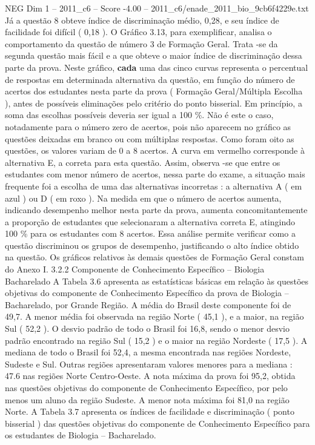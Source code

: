 \begin{textsample}{NEG Dim 1 – 2011\_c6 – Score -4.00 – 2011\_c6/enade\_2011\_bio\_9cb6f4229e.txt}
Já a questão 8 obteve índice de discriminação médio, 0,28, e seu índice de facilidade foi difícil ( 0,18 ).
O Gráfico 3.13, para exemplificar, analisa o comportamento da questão de número 3 de Formação Geral.
Trata -se da segunda questão mais fácil e a que obteve o maior índice de discriminação dessa parte da prova.
Neste gráfico, \textbf{cada} uma das cinco curvas representa o percentual de respostas em determinada alternativa da questão, em função do número de acertos dos estudantes nesta parte da prova ( Formação Geral/Múltipla Escolha ), antes de possíveis eliminações pelo critério do ponto bisserial.
Em princípio, a soma das escolhas possíveis deveria ser igual a 100 \%.
Não é este o caso, notadamente para o número zero de acertos, pois não aparecem no gráfico as questões deixadas em branco ou com múltiplas respostas.
Como foram oito as questões, os valores variam de 0 a 8 acertos.
A curva em vermelho corresponde à alternativa E, a correta para esta questão.
Assim, observa -se que entre os estudantes com menor número de acertos, nessa parte do exame, a situação mais frequente foi a escolha de uma das alternativas incorretas : a alternativa A ( em azul ) ou D ( em roxo ).
Na medida em que o número de acertos aumenta, indicando desempenho melhor nesta parte da prova, aumenta concomitantemente a proporção de estudantes que selecionaram a alternativa correta E, atingindo 100 \% para os estudantes com 8 acertos.
Essa análise permite verificar como a questão discriminou os grupos de desempenho, justificando o alto índice obtido na questão.
Os gráficos relativos às demais questões de Formação Geral constam do Anexo I. 3.2.2 Componente de Conhecimento Específico – Biologia Bacharelado A Tabela 3.6 apresenta as estatísticas básicas em relação às questões objetivas do componente de Conhecimento Específico da prova de Biologia – Bacharelado, por Grande Região.
A média do Brasil deste componente foi de 49,7.
A menor média foi observada na região Norte ( 45,1 ), e a maior, na região Sul ( 52,2 ).
O desvio padrão de todo o Brasil foi 16,8, sendo o menor desvio padrão encontrado na região Sul ( 15,2 ) e o maior na região Nordeste ( 17,5 ).
A mediana de todo o Brasil foi 52,4, a mesma encontrada nas regiões Nordeste, Sudeste e Sul.
Outras regiões apresentaram valores menores para a mediana : 47.6 nas regiões Norte Centro-Oeste.
A nota máxima da prova foi 95,2, obtida nas questões objetivas do componente de Conhecimento Específico, por pelo menos um aluno da região Sudeste.
A menor nota máxima foi 81,0 na região Norte.
A Tabela 3.7 apresenta os índices de facilidade e discriminação ( ponto bisserial ) das questões objetivas do componente de Conhecimento Específico para os estudantes de Biologia – Bacharelado.

\end{textsample}
